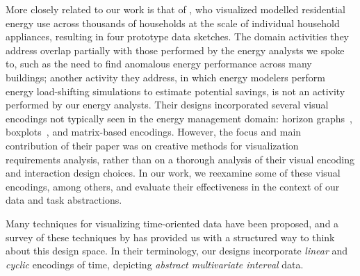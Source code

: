 More closely related to our work is that of \citet{Goodwin2013}, who visualized modelled residential energy use across thousands of households at the scale of individual household appliances, resulting in four prototype data sketches. 
The domain activities they address overlap partially with those performed by the energy analysts we spoke to, such as the need to find anomalous energy performance across many buildings; another activity they address, in which energy modelers perform energy load-shifting simulations to estimate potential savings, is not an activity performed by our energy analysts. 
Their designs incorporated several visual encodings not typically seen in the energy management domain: horizon graphs~\cite{Heer2009}, boxplots~\cite{Wickham2011}, and matrix-based encodings.
However, the focus and main contribution of their paper was on creative methods for visualization requirements analysis, rather than on a thorough analysis of their visual encoding and interaction design choices.
In our work, we reexamine some of these visual encodings, among others, and evaluate their effectiveness in the context of our data and task abstractions. 

 Many techniques for visualizing time-oriented data have been proposed, and a survey of these techniques by \citet{Aigner2011} has provided us with a structured way to think about this design space.
In their terminology, our designs incorporate {\it linear} and {\it cyclic} encodings of time, depicting {\it abstract multivariate interval} data.


